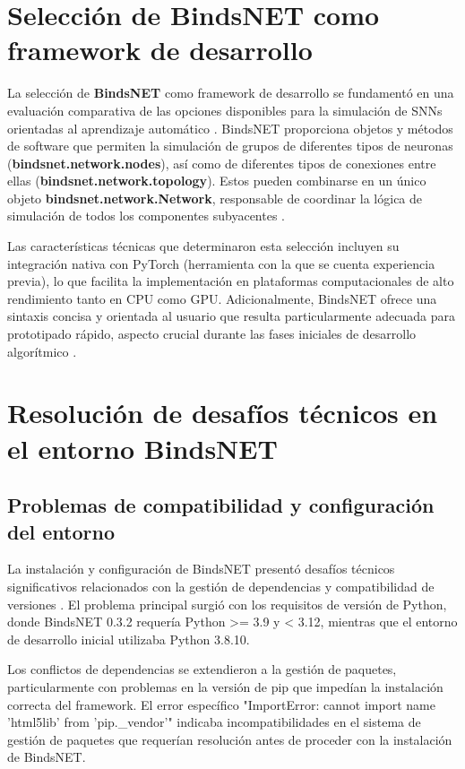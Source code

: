 \section{Selección de BindsNET como framework de desarrollo}

La selección de \textbf{BindsNET} como framework de desarrollo se fundamentó en una evaluación comparativa de las opciones disponibles para la simulación de SNNs orientadas al aprendizaje automático \cite{Hazan2018_BindsNET}. BindsNET proporciona objetos y métodos de software que permiten la simulación de grupos de diferentes tipos de neuronas (\textbf{bindsnet.network.nodes}), así como de diferentes tipos de conexiones entre ellas (\textbf{bindsnet.network.topology}). Estos pueden combinarse en un único objeto \textbf{bindsnet.network.Network}, responsable de coordinar la lógica de simulación de todos los componentes subyacentes \cite{bindsnet_docs}.

Las características técnicas que determinaron esta selección incluyen su integración nativa con PyTorch (herramienta con la que se cuenta experiencia previa), lo que facilita la implementación en plataformas computacionales de alto rendimiento tanto en CPU como GPU. Adicionalmente, BindsNET ofrece una sintaxis concisa y orientada al usuario que resulta particularmente adecuada para prototipado rápido, aspecto crucial durante las fases iniciales de desarrollo algorítmico \cite{bindsnet_docs}.

\section{Resolución de desafíos técnicos en el entorno BindsNET}
\subsection{Problemas de compatibilidad y configuración del entorno}

La instalación y configuración de BindsNET presentó desafíos técnicos significativos relacionados con la gestión de dependencias y compatibilidad de versiones . El problema principal surgió con los requisitos de versión de Python, donde BindsNET 0.3.2 requería Python >= 3.9 y < 3.12, mientras que el entorno de desarrollo inicial utilizaba Python 3.8.10.

Los conflictos de dependencias se extendieron a la gestión de paquetes, particularmente con problemas en la versión de pip que impedían la instalación correcta del framework. El error específico "ImportError: cannot import name 'html5lib' from 'pip.\_vendor'" indicaba incompatibilidades en el sistema de gestión de paquetes que requerían resolución antes de proceder con la instalación de BindsNET.

